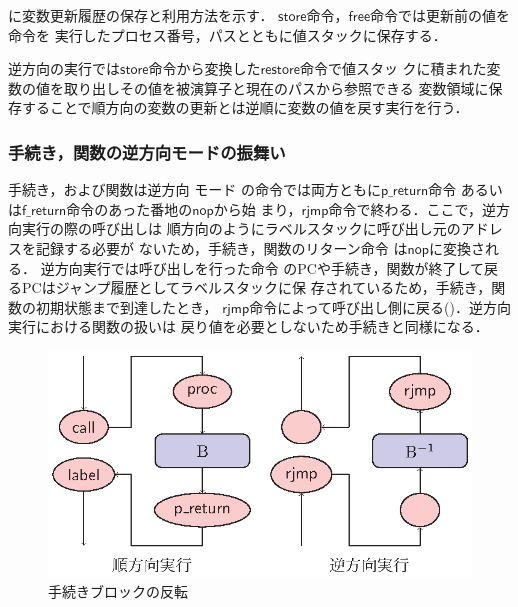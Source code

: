 \documentclass[submit,PRO]{ipsj}
\newcommand{\bcode}[1]{$\mathsf{#1}$}
\begin{document}
に変数更新履歴の保存と利用方法を示す．
\bcode{store}命令，\bcode{free}命令では更新前の値を命令を
実行したプロセス番号，パスとともに値スタックに保存する．

逆方向の実行では\bcode{store}命令から変換した\bcode{restore}命令で値スタッ
クに積まれた変数の値を取り出しその値を被演算子と現在のパスから参照できる
変数領域に保存することで順方向の変数の更新とは逆順に変数の値を戻す実行を行う．

\subsubsection{手続き，関数の逆方向モードの振舞い}

手続き，および関数は逆方向%
モード%
の命令では両方ともに\bcode{p\_return}命令
あるいは\bcode{f\_return}命令のあった番地の\bcode{nop}から始
まり，\bcode{rjmp}命令で終わる．ここで，逆方向実行の際の呼び出しは
順方向のようにラベルスタックに呼び出し元のアドレスを記録する必要が
ないため，手続き，関数のリターン命令%
は\bcode{nop}に変換される．%
逆方向実行では呼び出しを行った命令
のPCや手続き，関数が終了して戻るPCはジャンプ履歴としてラベルスタックに保
存されているため，手続き，関数の初期状態まで到達したとき，
\bcode{rjmp}命令によって呼び出し側に戻る()．逆方向実行における関数の扱いは
戻り値を必要としないため手続きと同様になる．

\begin{figure}[tb]
\begin{center}
\includegraphics[width=.75\linewidth]{./proc-flow.eps}
\end{center}
\caption{手続きブロックの反転}
\label{fig:procFlow}
\end{figure}
\end{document}
